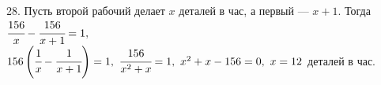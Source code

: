 28. Пусть второй рабочий делает $x$ деталей в час, а первый --- $x+1.$ Тогда $\cfrac{156}{x}-\cfrac{156}{x+1}=1,$\\$ 156\left(\cfrac{1}{x}-\cfrac{1}{x+1}\right)=1,\
\cfrac{156}{x^2+x}=1,\ x^2+x-156=0,\ x=12$ деталей в час.\\

